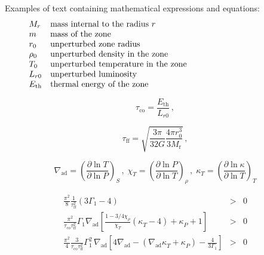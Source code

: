 \documentclass[a4paper,10pt]{article}
\begin{document}
Examples of text containing mathematical expressions and equations: 
   \[
      \begin{array}{lp{0.8\linewidth}}
         M_{r}  & mass internal to the radius $r$     \\
         m               & mass of the zone                    \\
         r_0             & unperturbed zone radius             \\
         \rho_0          & unperturbed density in the zone     \\
         T_0             & unperturbed temperature in the zone \\
         L_{r0}          & unperturbed luminosity              \\
         E_{\mathrm{th}} & thermal energy of the zone
      \end{array}
   \]

\noindent
    
   \begin{equation}
      \tau_{\mathrm{co}} = \frac{E_{\mathrm{th}}}{L_{r0}} \,,
   \end{equation}


   \begin{equation}
      \tau_{\mathrm{ff}} =
         \sqrt{ 
	 	\frac{3 \pi}{32 G} \frac{4\pi r_0^3}{3 M_{\mathrm{r}}}
	 }\,,
   \end{equation}


   \begin{displaymath}
      \nabla_{\mathrm{ad}} = \left( \frac{ \partial \ln T}
                             { \partial\ln P} \right)_{S} \, , \;
      \chi^{}_T       = \left( \frac{ \partial \ln P}
                             { \partial\ln T} \right)_{\rho} \, , \;
      \kappa^{}_{T}   = \left( \frac{ \partial \ln \kappa}
                             { \partial\ln T} \right)_{T}
   \end{displaymath}

   \begin{eqnarray}
      \frac{\pi^2}{8} \frac{1}{\tau_{\mathrm{ff}}^2}
                ( 3 \Gamma_1 - 4 )
         & > & 0 \label{ZSDynSta} \\
      \frac{\pi^2}{\tau_{\mathrm{co}}
                   \tau_{\mathrm{ff}}^2}
                   \Gamma_1 \nabla_{\mathrm{ad}}
                   \left[ \frac{ 1- 3/4 \chi^{}_\rho }{ \chi^{}_T }
                          ( \kappa^{}_T - 4 )
                        + \kappa^{}_P + 1
                   \right]
        & > & 0 \label{ZSSecSta} \\
     \frac{\pi^2}{4} \frac{3}{\tau_{ \mathrm{co} }
                              \tau_{ \mathrm{ff} }^2
                             }
         \Gamma_1^2 \, \nabla_{\mathrm{ad}} \left[
                                   4 \nabla_{\mathrm{ad}}
                                   - ( \nabla_{\mathrm{ad}} \kappa^{}_T
                                     + \kappa^{}_P
                                     )
                                   - \frac{4}{3 \Gamma_1}
                                \right]
        & > & 0   \label{ZSVibSta}
   \end{eqnarray}
\end{document}
